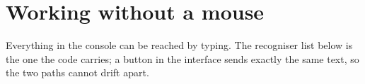 {\small\noindent{}}


\section{Working without a mouse}
Everything in the console can be reached by typing. The recogniser list below is
the one the code carries; a button in the interface sends exactly the same text,
so the two paths cannot drift apart.

